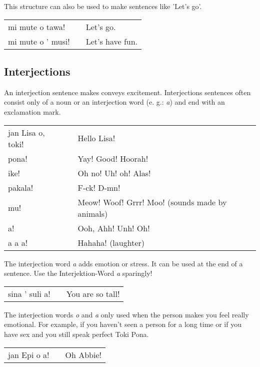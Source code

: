 {
This structure can also be used to make sentences like 'Let's go'.

\begin{supertabular}{p{5,5cm}|ll}
mi mute o tawa! && Let's go. \\
mi mute o ' musi! && Let's have fun. \\
\end{supertabular} 
%
\subsection*{Interjections}
%
%
An interjection sentence makes conveys excitement.
Interjections sentences often consist only of a noun or an interjection word (e. g.: \textit{a}) and end with an exclamation mark.

\begin{supertabular}{p{5,5cm}|ll}
jan Lisa o, toki! && Hello Lisa! \\
pona! && Yay! Good! Hoorah! \\
ike! && Oh no! Uh! oh! Alas! \\
pakala! && F-ck! D-mn! \\
mu! && Meow! Woof! Grrr! Moo! (sounds made by animals) \\
a! && Ooh, Ahh! Unh! Oh! \\
a a a! && Hahaha! (laughter) \\
\end{supertabular} 

The interjection word \textit{a} adds emotion or stress. 
It can be used at the end of a sentence.
Use the Interjektion-Word \textit{a} sparingly!

\begin{supertabular}{p{5,5cm}|ll}
sina ' suli a! && You are so tall! \\
\end{supertabular} 

The interjection words \textit{o} and \textit{a} only used when the person makes you feel really emotional. 
For example, if you haven't seen a person for a long time or if you have sex and you still speak perfect Toki Pona. 

\begin{supertabular}{p{5,5cm}|ll}
jan Epi o a! && Oh Abbie! \\
\end{supertabular} 

}
